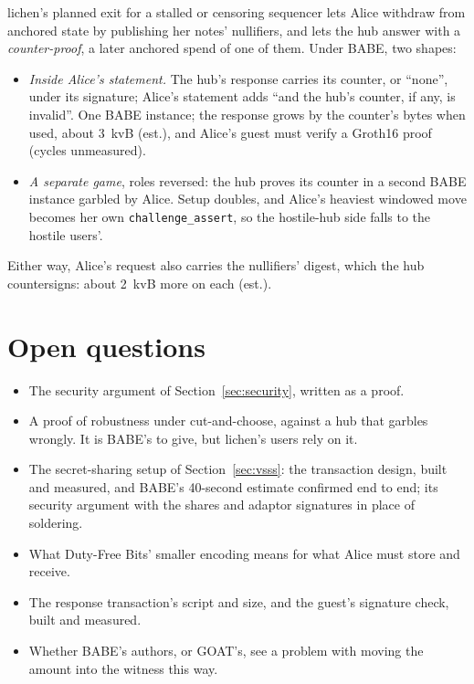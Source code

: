\documentclass[11pt]{article}
\newcommand{\tx}[1]{\texttt{#1}}
\begin{document}
lichen's planned exit for a stalled or censoring sequencer lets Alice
withdraw from anchored state by publishing her notes' nullifiers, and
lets the hub answer with a \emph{counter-proof}, a later anchored spend
of one of them. Under BABE, two shapes:
\begin{itemize}[leftmargin=1.5em]
\item \emph{Inside Alice's statement.} The hub's response carries its
  counter, or ``none'', under its signature; Alice's statement adds
  ``and the hub's counter, if any, is invalid''. One BABE instance; the
  response grows by the counter's bytes when used, about 3~kvB (est.),
  and Alice's guest must verify a Groth16 proof (cycles unmeasured).
\item \emph{A separate game}, roles reversed: the hub proves its counter
  in a second BABE instance garbled by Alice. Setup doubles, and Alice's
  heaviest windowed move becomes her own \tx{challenge\_assert}, so the
  hostile-hub side falls to the hostile users'.
\end{itemize}
Either way, Alice's request also carries the nullifiers' digest, which
the hub countersigns: about 2~kvB more on each (est.).

\section{Open questions}
\label{sec:open}

\begin{itemize}[leftmargin=1.5em]
\item The security argument of Section~\ref{sec:security}, written as a
  proof.
\item A proof of robustness under cut-and-choose, against a hub that
  garbles wrongly. It is BABE's to give, but lichen's users rely on it.
\item The secret-sharing setup of Section~\ref{sec:vsss}: the
  transaction design, built and measured, and BABE's 40-second estimate
  confirmed end to end; its security argument with the shares and
  adaptor signatures in place of soldering.
\item What Duty-Free Bits' smaller encoding means for what Alice must
  store and receive.
\item The response transaction's script and size, and the guest's
  signature check, built and measured.
\item Whether BABE's authors, or GOAT's, see a problem with moving the
  amount into the witness this way.
\end{itemize}
\end{document}
